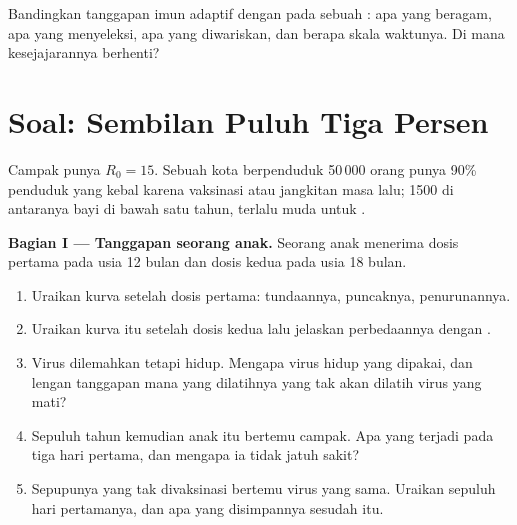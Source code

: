 \begin{exercise}[$\star\star\star$]\label{exo:g12:adaptive-immunity:15}
Bandingkan tanggapan imun adaptif dengan  pada sebuah
: apa yang beragam, apa yang menyeleksi, apa yang diwariskan,
dan berapa skala waktunya. Di mana kesejajarannya berhenti?
\end{exercise}

\section{Soal: Sembilan Puluh Tiga Persen}

\begin{problem}
\label{pb:g12:adaptive-immunity:1}
Campak punya $R_0 = 15$. Sebuah kota berpenduduk 50\,000 orang punya
90\% penduduk yang kebal karena vaksinasi atau jangkitan masa lalu;
1500 di antaranya bayi di bawah satu tahun, terlalu muda untuk .

\medskip
\noindent\textbf{Bagian I --- Tanggapan seorang anak.}
Seorang anak menerima dosis pertama pada usia 12 bulan dan dosis kedua
pada usia 18 bulan.
\begin{enumerate}
  \item Uraikan kurva  setelah dosis pertama: tundaannya,
        puncaknya, penurunannya.
  \item Uraikan kurva itu setelah dosis kedua lalu jelaskan
        perbedaannya dengan .
  \item Virus  dilemahkan tetapi hidup. Mengapa virus hidup
        yang dipakai, dan lengan tanggapan mana yang dilatihnya yang
        tak akan dilatih virus yang mati?
  \item Sepuluh tahun kemudian anak itu bertemu campak. Apa yang
        terjadi pada tiga hari pertama, dan mengapa ia tidak jatuh
        sakit?
  \item Sepupunya yang tak divaksinasi bertemu virus yang sama. Uraikan
        sepuluh hari pertamanya, dan apa yang disimpannya sesudah itu.
\end{enumerate}


\end{problem}
